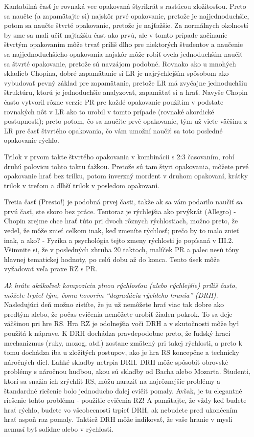 Kantabilná časť je rovnaká vec opakovaná štyrikrát s rastúcou zložitosťou. Preto sa naučte (a zapamätajte si) najskôr prvé opakovanie, pretože je najjednoduchšie, potom sa naučte štvrté opakovanie, pretože je najťažšie. Za normálnych okolností by sme sa mali učiť najťažšiu časť ako prvú, ale v tomto prípade začínanie štvrtým opakovaním môže trvať príliš dlho pre niektorých študentov a naučenie sa najjednoduchšieho opakovania najskôr môže robiť oveľa jednoduchším naučiť sa štvrté opakovanie, pretože sú navzájom podobné. Rovnako ako u mnohých skladieb Chopina, dobré zapamätanie si ĽR je najrýchlejším spôsobom ako vybudovať pevný základ pre zapamätanie, pretože ĽR má zvyčajne jednoduchšiu štruktúru, ktorú je jednoduchšie analyzovať, zapamätať si a hrať. Navyše Chopin často vytvoril rôzne verzie PR pre každé opakovanie použitím v podstate rovnakých nôt v ĽR ako to urobil v tomto prípade (rovnaké akordické postupnosti); preto potom, čo sa naučíte prvé opakovanie, tým už viete väčšinu z ĽR pre časť štvrtého opakovania, čo vám umožní naučiť sa toto posledné opakovanie rýchlo.

Trilok v prvom takte štvrtého opakovania v kombinácii s 2:3 časovaním, robí druhú polovicu tohto taktu ťažkou. Pretože sú tam štyri opakovania, môžete prvé opakovanie hrať bez trilku, potom inverzný mordent v druhom opakovaní, krátky trilok v treťom a dlhší trilok v posledom opakovaní.

Tretia časť (Presto!) je podobná prvej časti, takže ak sa vám podarilo naučiť sa prvú časť, ste skoro bez práce. Tentoraz je rýchlejšia ako prvýkrát (Allegro) - Chopin zrejme chce hrať túto pri dvoch rôznych rýchlostiach, možno preto, že vedel, že môže znieť celkom inak, keď zmeníte rýchlosť; prečo by to malo znieť inak, a ako? - Fyzika a psychológia tejto zmeny rýchlosti je popísaná v III.2. Všimnite si, že v posledných zhruba 20 taktoch, malíček PR a palec nesú tóny hlavnej tematickej hodnoty, po celú dobu až do konca. Tento úsek môže vyžadovať veľa praxe RZ s PR.

\emph{Ak hráte akúkoľvek kompozíciu plnou rýchlosťou (alebo rýchlejšie) príliš často, môžete trpieť tým, čomu hovorím “degradácia rýchleho hrania” (DRH).} Nasledujúci deň možno zistíte, že ju už  nemôžete hrať viac tak dobre ako predtým alebo, že počas cvičenia nemôžete urobiť žiaden pokrok. To sa deje väčšinou pri hre RS. Hra RZ je odolnejšia voči DRH a v skutočnosti môže byť použitá k náprave. K DRH dochádza pravdepodobne preto, že ľudský hrací mechanizmus (ruky, mozog, atď.) zostane zmätený pri takej rýchlosti, a preto k tomu dochádza iba u zložitých postupov, ako je hra RS koncepčne a technicky náročných diel. Ľahké skladby netrpia DRH. DRH môže spôsobiť obrovské problémy s náročnou hudbou, akou   sú skladby od Bacha alebo Mozarta. Študenti, ktorí sa snažia ich zrýchliť RS, môžu naraziť na najrôznejšie problémy a štandardné riešenie bolo jednoducho ďalej cvičiť pomaly. Avšak, je tu elegantné riešenie tohto problému - použitie cvičenia RZ! A pamätajte, že vždy keď budete hrať rýchlo, budete vo všeobecnosti trpieť DRH, ak nebudete pred ukončením hrať aspoň raz pomaly. Taktiež DRH môže indikovať, že vaše hranie v mysli nemusí byť solídne alebo v rýchlosti.

